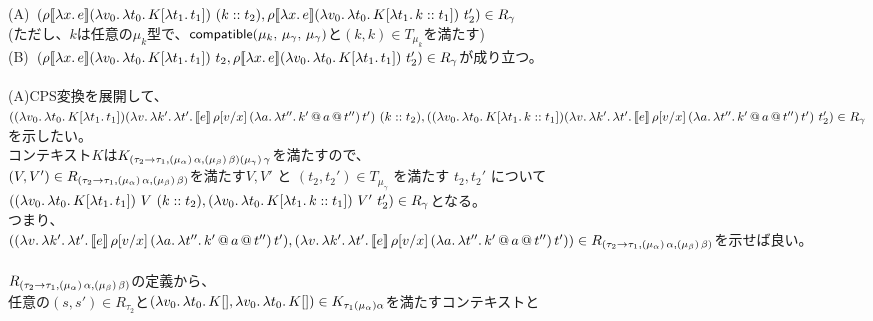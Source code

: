 (A)\ $(\rho \CPSTh{\Lam{x}{e}} \LamP{v_0}{\Lam{t_0}{K[\Lam{t_1}{t_1}]}}\ \ConsP{k}{t_2}, \rho \CPSTh{\Lam{x}{e}} \LamP{v_0}{\Lam{t_0}{K[\Lam{t_1}{\Cons{k}{t_1}}]}}\ t_2')\in R_{\gamma}$\\
(ただし、$k$は任意の$\mu_k$型で、$\Compatible{\mu_k}{\mu_{\gamma}}{\mu_{\gamma}}$と$(k,k)\in T_{\mu_k}$を満たす)\\
  (B)\ $(\rho \CPSTh{\Lam{x}{e}} \LamP{v_0}{\Lam{t_0}{K[\Lam{t_1}{t_1}]}}\ t_2, \rho \CPSTh{\Lam{x}{e}} \LamP{v_0}{\Lam{t_0}{K[\Lam{t_1}{t_1}]}}\ t_2')\in R_{\gamma}$が成り立つ。\\
\\
(A)CPS変換を展開して、\\
$(\LamP{v_0}{\Lam{t_0}{K[\Lam{t_1}{t_1}]}}
          \LamP{v}{\Lam{k'}{\Lam{t'}{\CPS{e}{\rho[\Change{x}{v}]}
           {\LamP{a}{\Lam{t''}
               {\App{\App{k'}{a}}{t''}}}}{t'}}}}\ \ConsP{k}{t_2},\\
  (\LamP{v_0}{\Lam{t_0}{K[\Lam{t_1}{\Cons{k}{t_1}}]}}
          \LamP{v}{\Lam{k'}{\Lam{t'}{\CPS{e}{\rho[\Change{x}{v}]}
           {\LamP{a}{\Lam{t''}
               {\App{\App{k'}{a}}{t''}}}}{t'}}}}\ t_2')\in R_{\gamma}$を示したい。\\
コンテキスト$K$は$K_{\ArrowTrailP{\tau_2}{\tau_1}{\TrailType{\alpha}}{\TrailType{\beta}} \TrailType{\gamma}}$を満たすので、\\
$(V,V')\in R_{\ArrowTrailP{\tau_2}{\tau_1}{\TrailType{\alpha}}{\TrailType{\beta}}}$を満たす$V,V'$ と $(t_2, t_2') \in T_{\mu_{\gamma}}$ を満たす $t_2, t_2'$ について\\
$(\LamP{v_0}{\Lam{t_0}{K[\Lam{t_1}{t_1}]}}\ V\ \ConsP{k}{t_2}, \LamP{v_0}{\Lam{t_0}{K[\Lam{t_1}{\Cons{k}{t_1}}]}}\ V'\ t_2')\in R_{\gamma}$となる。\\
つまり、\\
      $(\LamP{v}{\Lam{k'}{\Lam{t'}{\CPS{e}{\rho[\Change{x}{v}]}
           {\LamP{a}{\Lam{t''}
               {\App{\App{k'}{a}}{t''}}}}{t'}}}},\\
         \LamP{v}{\Lam{k'}{\Lam{t'}{\CPS{e}{\rho[\Change{x}{v}]}
           {\LamP{a}{\Lam{t''}
               {\App{\App{k'}{a}}{t''}}}}{t'}}}})\in R_{\ArrowTrailP{\tau_2}{\tau_1}{\TrailType{\alpha}}{\TrailType{\beta}}}$を示せば良い。\\
\\
$R_{\ArrowTrailP{\tau_2}{\tau_1}{\TrailType{\alpha}}{\TrailType{\beta}}}$の定義から、\\
任意の$(s,s')\in R_{\tau_2}$と$(\Lam{v_0}{\Lam{t_0}{K[]}}, \Lam{v_0}{\Lam{t_0}{K[]}})\in  K_{\tau_1(\mu_{\alpha})\alpha}$を満たすコンテキストと
